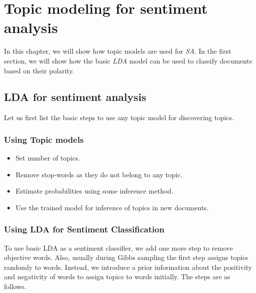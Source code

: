
\chapter{Topic modeling for sentiment analysis} %

\label{topicmodeledsa} %



In this chapter, we will show how topic models are used for \textit{SA}. In the first section, we will show how the basic 
\textit{LDA} model can be used to classify documents based on their polarity.

\section{LDA for sentiment analysis}

Let us first list the basic steps to use any topic model for discovering topics.

\subsection{Using Topic models}

\begin{itemize}
 \itemsep0em
 \item Set number of topics.
 \item Remove stop-words as they do not belong to any topic.
 \item Estimate probabilities using some inference method.
 \item Use the trained model for inference of topics in new documents.
\end{itemize}

\subsection{Using LDA for Sentiment Classification}

To use basic LDA as a sentiment classifier, we add one more step to remove objective words.
Also, usually during Gibbs sampling the first step assigns topics randomly to words. Instead, we
introduce a prior information about the positivity and negativity of words to assign topics to 
words initially. The steps are as follows.

